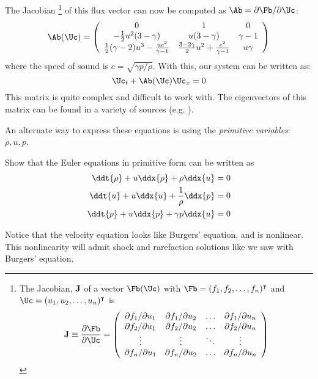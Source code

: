 The Jacobian%
\footnote{
The Jacobian, ${\bf J}$ of a vector $\Fb(\Uc)$ with $\Fb = (f_1, f_2, \ldots, f_n)^\intercal$ and
$\Uc = (u_1, u_2, \ldots, u_n)^\intercal$ is
\begin{equation*}
{\bf J} \equiv \frac{\partial \Fb}{\partial \Uc} = \left (
  \begin{array}{cccc}
     \partial f_1/\partial u_1 & \partial f_1/\partial u_2 & \ldots & \partial f_1/\partial u_n \\
     \partial f_2/\partial u_1 & \partial f_2/\partial u_2 & \ldots & \partial f_2/\partial u_n \\
     \vdots                    & \vdots                    & \ddots & \vdots \\
     \partial f_n/\partial u_1 & \partial f_n/\partial u_2 & \ldots & \partial f_n/\partial u_n
  \end{array} \right )
\end{equation*}
}
of this flux vector can now be computed as $\Ab = \partial
\Fb/\partial \Uc$:
\begin{equation}
\Ab(\Uc) = \left ( \begin{array}{ccc}
   0  & 1 & 0 \\
   -\frac{1}{2}u^2(3 -\gamma) & u (3 -\gamma) & \gamma - 1 \\
   \frac{1}{2}(\gamma -2)u^3 - \frac{uc^2}{\gamma -1} &
       \frac{3-2\gamma}{2} u^2 + \frac{c^2}{\gamma -1} & u \gamma
  \end{array} \right )
\end{equation}
where the speed of sound is $c = \sqrt{\gamma p/\rho}$.   With this, our
system can be written as:
\begin{equation}
\Uc_t + \Ab(\Uc) \Uc_x = 0
\end{equation}
This matrix is quite complex and difficult to work with.  The
eigenvectors of this matrix can be found in a variety of sources
(e.g. \cite{toro:1997,athena}).


An alternate way to express these equations is using the {\em
  primitive variables}: $\rho, u, p$.
\begin{exercise}
{Show that the Euler equations in primitive form can
  be written as
\begin{align}
\ddt{\rho} + u \ddx{\rho} + \rho \ddx{u} &= 0 \\
\ddt{u} + u \ddx{u} + \frac{1}{\rho} \ddx{p} &= 0 \\
\ddt{p} + u \ddx{p} + \gamma p \ddx{u} &= 0 \label{eq:prim:p}
\end{align}
}
\end{exercise}
Notice that the velocity equation looks like Burgers' equation, and
is nonlinear.  This nonlinearity will admit shock and rarefaction
solutions like we saw with Burgers' equation.

